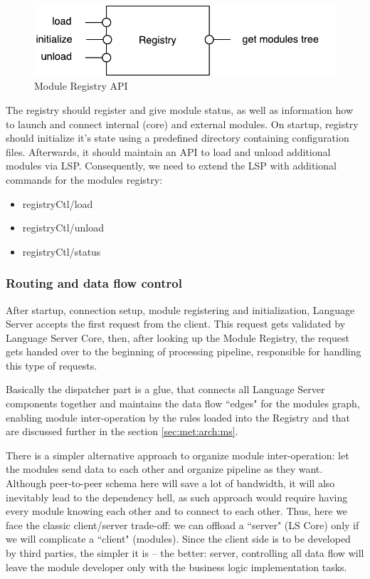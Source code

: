 \begin{figure}[H]
    \centering
    \includegraphics[width=.7\textwidth]{figs/registry.pdf}
    \caption{Module Registry API}
\end{figure}

\newpage
The registry should register and give module status, as well as information how to launch and connect
internal (core) and external modules. On startup, registry should initialize it's state using a predefined directory
containing configuration files. Afterwards, it should maintain an API to load and unload additional modules via LSP.
Consequently, we need to extend the LSP with additional commands for the modules registry:

\begin{itemize}
    \item registryCtl/load
    \item registryCtl/unload
    \item registryCtl/status
\end{itemize}

\subsubsection{Routing and data flow control}
\label{sec:met:arch:core:dispatcher}

After startup, connection setup, module registering and initialization, 
Language Server accepts the first request from the client. 
This request gets validated by Language Server Core, then, after looking up the Module Registry, the request 
gets handed over to the beginning of processing pipeline, responsible for handling this type of requests.

Basically the dispatcher part is a glue, that connects all Language Server components together and 
maintains the data flow ``edges" for the modules graph, enabling module inter-operation by the
rules loaded into the Registry and that are discussed further in the section \ref{sec:met:arch:ms}.

There is a simpler alternative approach to organize module inter-operation: let the modules send data 
to each other and organize pipeline as they want. Although peer-to-peer schema here will save a lot of bandwidth, 
it will also inevitably lead to the dependency hell, 
as such approach would require having every module knowing each other and to connect to each other. 
Thus, here we face the classic client/server trade-off: we can offload a ``server" (LS Core) only
if we will complicate a ``client" (modules). 
Since the client side is to be developed by third parties, the simpler it is -- the better: 
server, controlling all data flow will leave the module developer only with the business logic implementation tasks. 

